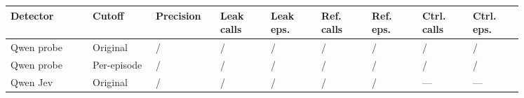 \begin{tabular}{@{}>{\raggedright\arraybackslash}p{0.13\linewidth}>{\raggedright\arraybackslash}p{0.1\linewidth}>{\raggedright\arraybackslash}p{0.088\linewidth}>{\raggedright\arraybackslash}p{0.088\linewidth}>{\raggedright\arraybackslash}p{0.088\linewidth}>{\raggedright\arraybackslash}p{0.088\linewidth}>{\raggedright\arraybackslash}p{0.088\linewidth}>{\raggedright\arraybackslash}p{0.088\linewidth}>{\raggedright\arraybackslash}p{0.088\linewidth}@{}}
\toprule
Detector & Cutoff & Precision & Leak calls & Leak eps. & Ref. calls & Ref. eps. & Ctrl. calls & Ctrl. eps. \\
\midrule
Qwen probe & Original & \qwenCalibrationOriginalPrecisionNumerator{}/\qwenCalibrationOriginalPrecisionDenominator{} & \qwenCalibrationOriginalLeakCallsNumerator{}/\qwenCalibrationOriginalLeakCallsDenominator{} & \qwenCalibrationOriginalLeakEpisodesNumerator{}/\qwenCalibrationOriginalLeakEpisodesDenominator{} & \qwenCalibrationOriginalRefusingCallsNumerator{}/\qwenCalibrationOriginalRefusingCallsDenominator{} & \qwenCalibrationOriginalRefusingEpisodesNumerator{}/\qwenCalibrationOriginalRefusingEpisodesDenominator{} & \qwenCalibrationOriginalControlCallsNumerator{}/\qwenCalibrationOriginalControlCallsDenominator{} & \qwenCalibrationOriginalControlEpisodesNumerator{}/\qwenCalibrationOriginalControlEpisodesDenominator{} \\
Qwen probe & Per-episode & \qwenCalibrationEpisodePrecisionNumerator{}/\qwenCalibrationEpisodePrecisionDenominator{} & \qwenCalibrationEpisodeLeakCallsNumerator{}/\qwenCalibrationEpisodeLeakCallsDenominator{} & \qwenCalibrationEpisodeLeakEpisodesNumerator{}/\qwenCalibrationEpisodeLeakEpisodesDenominator{} & \qwenCalibrationEpisodeRefusingCallsNumerator{}/\qwenCalibrationEpisodeRefusingCallsDenominator{} & \qwenCalibrationEpisodeRefusingEpisodesNumerator{}/\qwenCalibrationEpisodeRefusingEpisodesDenominator{} & \qwenCalibrationEpisodeControlCallsNumerator{}/\qwenCalibrationEpisodeControlCallsDenominator{} & \qwenCalibrationEpisodeControlEpisodesNumerator{}/\qwenCalibrationEpisodeControlEpisodesDenominator{} \\
Qwen Jev & Original & \qwenJevCalibrationOriginalPrecisionNumerator{}/\qwenJevCalibrationOriginalPrecisionDenominator{} & \qwenJevCalibrationOriginalLeakCallsNumerator{}/\qwenJevCalibrationOriginalLeakCallsDenominator{} & \qwenJevCalibrationOriginalLeakEpisodesNumerator{}/\qwenJevCalibrationOriginalLeakEpisodesDenominator{} & \qwenJevCalibrationOriginalRefusingCallsNumerator{}/\qwenJevCalibrationOriginalRefusingCallsDenominator{} & \qwenJevCalibrationOriginalRefusingEpisodesNumerator{}/\qwenJevCalibrationOriginalRefusingEpisodesDenominator{} & --- & --- \\

\end{tabular}
